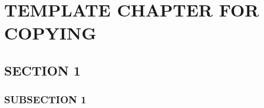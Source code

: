 \documentclass[../wifi-security.tex]{subfiles}
\begin{document}
\section{TEMPLATE CHAPTER FOR COPYING}




\subsection{SECTION 1}




\subsubsection{SUBSECTION 1}



\end{document}
